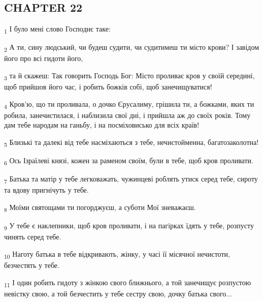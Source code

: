 \subsection{CHAPTER 22}
\begin{tcolorbox}
\textsubscript{1} І було мені слово Господнє таке:
\end{tcolorbox}
\begin{tcolorbox}
\textsubscript{2} А ти, сину людський, чи будеш судити, чи судитимеш ти місто крови? І завідом його про всі гидоти його,
\end{tcolorbox}
\begin{tcolorbox}
\textsubscript{3} та й скажеш: Так говорить Господь Бог: Місто проливає кров у своїй середині, щоб прийшов його час, і робить божків собі, щоб занечищуватися!
\end{tcolorbox}
\begin{tcolorbox}
\textsubscript{4} Кров'ю, що ти проливала, о дочко Єрусалиму, грішила ти, а божками, яких ти робила, занечистилася, і наблизила свої дні, і прийшла аж до своїх років. Тому дам тебе народам на ганьбу, і на посміховисько для всіх країв!
\end{tcolorbox}
\begin{tcolorbox}
\textsubscript{5} Близькі та далекі від тебе насміхаються з тебе, нечистойменна, багатозаколотна!
\end{tcolorbox}
\begin{tcolorbox}
\textsubscript{6} Ось Ізраїлеві князі, кожен за раменом своїм, були в тебе, щоб кров проливати.
\end{tcolorbox}
\begin{tcolorbox}
\textsubscript{7} Батька та матір у тебе легковажать, чужинцеві роблять утиск серед тебе, сироту та вдову пригнічуть у тебе.
\end{tcolorbox}
\begin{tcolorbox}
\textsubscript{8} Моїми святощами ти погорджуєш, а суботи Мої зневажаєш.
\end{tcolorbox}
\begin{tcolorbox}
\textsubscript{9} У тебе є наклепники, щоб кров проливати, і на пагірках їдять у тебе, розпусту чинять серед тебе.
\end{tcolorbox}
\begin{tcolorbox}
\textsubscript{10} Наготу батька в тебе відкривають, жінку, у часі її місячної нечистоти, безчестять у тебе.
\end{tcolorbox}
\begin{tcolorbox}
\textsubscript{11} І один робить гидоту з жінкою свого ближнього, а той занечищує розпустою невістку свою, а той безчестить у тебе сестру свою, дочку батька свого...
\end{tcolorbox}
